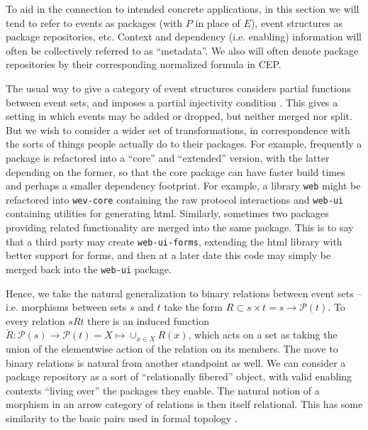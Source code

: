 \documentclass[hoptionsi,review,screen,format=sigconf]{acmart}
\theoremstyle{definition}
\newcommand{\Pc}{\mathcal{P}}
\begin{document}
To aid in the connection to intended concrete applications, in this section we will tend to refer to events as packages (with \(P\) in place of \(E\)), event structures as package repositories, etc. Context and dependency (i.e. enabling) information will often be collectively referred to as ``metadata''. We also will often denote package repositories by their corresponding normalized formula in CEP.

The usual way to give a category of event structures  considers partial functions between event sets, and imposes a partial injectivity condition \cite{winskel1986event}. 
This gives a setting in which events may be added or dropped, but neither merged nor split. But we wish to consider a wider set of transformations, in correspondence with the sorts of things people actually do to their packages. For example, frequently a package is refactored into a ``core'' and ``extended'' version, with the latter depending on the former, so that the core package can have faster build times and perhaps a smaller dependency footprint. For example, a library \texttt{web} might be refactored into \texttt{wev-core} containing the raw protocol interactions and \texttt{web-ui} containing utilities for generating html. Similarly, sometimes two packages providing related functionality are merged into the same package. This is to say that a third party may create \texttt{web-ui-forms}, extending the html library with better support for forms, and then at a later date this code may simply be merged back into the \texttt{web-ui} package.

Hence, we take the natural generalization to binary relations between event sets -- i.e. morphisms between sets \(s\) and \(t\) take the form \(R \subset s \times t = s \to \Pc(t)\). To every relation \(s R t\) there is an induced function \(\check{R} : \Pc(s) \to \Pc(t) = X \mapsto \cup_{x \in X} R(x)\), which acts on a set as taking the union of the elementwise action of the relation on its members. The move to binary relations is natural from another standpoint as well. We can consider a package repository as a sort of ``relationally fibered'' object, with valid enabling contexts ``living over'' the packages they enable. The natural notion of a morphism in an arrow category of relations is then itself relational. This has some similarity to the basic pairs used in formal topology \cite{sambin1998preview, bucalo2006completions}. 
\end{document}

